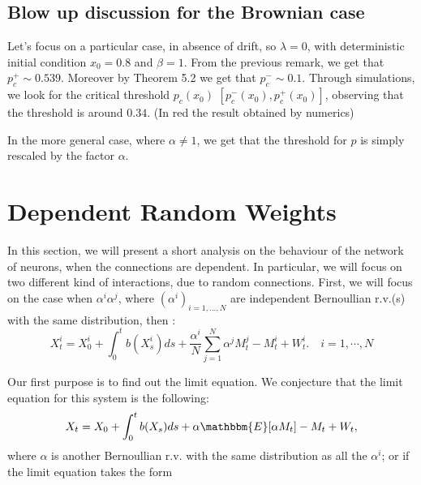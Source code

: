 \documentclass[11pt, a4paper]{article}
\begin{document}
\subsection{Blow up discussion for the Brownian case}
Let's focus on a particular case, in absence of drift, so $\lambda=0$, with deterministic initial condition $x_0=0.8$ and $\beta=1$. From the previous remark, we get that $p^+_c\sim 0.539$. Moreover by Theorem 5.2 we get that $p^-_c\sim 0.1$.
Through simulations, we look for the critical threshold $p_c(x_0)$ $[p^-_c(x_0),p^+_c(x_0)]$, observing that the threshold is around $0.34$. (In red the result obtained by numerics)\\ 


In the more general case, where $\alpha\neq 1$, we get that the threshold for $p$ is simply rescaled by the factor $\alpha$.

\section{Dependent Random Weights}
In this section, we will present a short analysis on the behaviour of the network of neurons, when the connections are dependent. In particular, we will focus on two different kind of interactions, due to random connections.
First, we will focus on the case when $\alpha^i \alpha^j$, where $(\alpha^i)_{i = 1, ..., N}$ are independent Bernoullian r.v.(s) with the same distribution, then :
\begin{equation}
 X^i_t = X^i_0 + \int_0^t b(X^i_s) ds + \frac{\alpha^i}{N} \sum_{j = 1}^N \alpha^{j} M^j_t - M^i_t + W^i_t. \quad  i=1,\cdots,N\label{eq:aiaj}
 \end{equation}
 
Our first purpose is to find out the limit equation. We conjecture that the limit equation for this system is the following:
\begin{equation} \label{eq1} X_t = X_0 + \int_0^t b(X_s) ds + \alpha \mathbbm{E}[\alpha M_t] - M_t + W_t, \end{equation} where $\alpha$ is another Bernoullian r.v. with the same distribution as all the $\alpha^{i}$; or if the limit equation takes the form 
\end{document}
